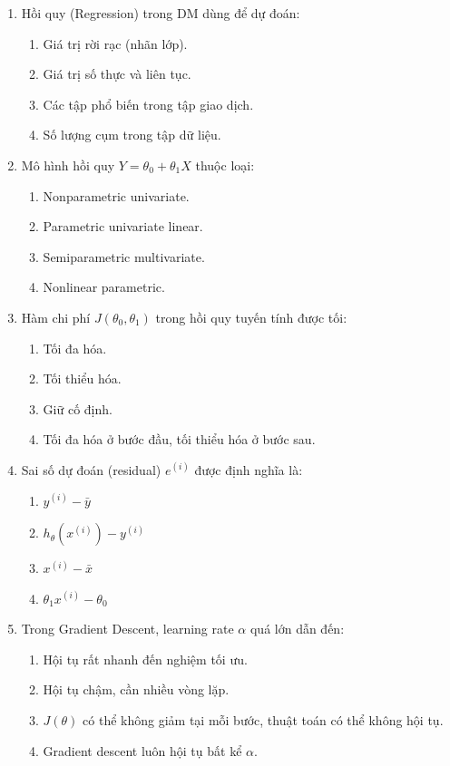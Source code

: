 \documentclass[10pt]{article}
\begin{document}
\begin{enumerate}[leftmargin=*, label=\textbf{Câu \arabic*.}]

    \item Hồi quy (Regression) trong DM dùng để dự đoán:
    \begin{enumerate}[label=\Alph*.]
        \item Giá trị rời rạc (nhãn lớp).
        \item Giá trị số thực và liên tục.
        \item Các tập phổ biến trong tập giao dịch.
        \item Số lượng cụm trong tập dữ liệu.
    \end{enumerate}

    \item Mô hình hồi quy $Y = \theta_0 + \theta_1 X$ thuộc loại:
    \begin{enumerate}[label=\Alph*.]
        \item Nonparametric univariate.
        \item Parametric univariate linear.
        \item Semiparametric multivariate.
        \item Nonlinear parametric.
    \end{enumerate}

    \item Hàm chi phí $J(\theta_0, \theta_1)$ trong hồi quy tuyến tính được tối:
    \begin{enumerate}[label=\Alph*.]
        \item Tối đa hóa.
        \item Tối thiểu hóa.
        \item Giữ cố định.
        \item Tối đa hóa ở bước đầu, tối thiểu hóa ở bước sau.
    \end{enumerate}

    \item Sai số dự đoán (residual) $e^{(i)}$ được định nghĩa là:
    \begin{enumerate}[label=\Alph*.]
        \item $y^{(i)} - \bar{y}$
        \item $h_\theta(x^{(i)}) - y^{(i)}$
        \item $x^{(i)} - \bar{x}$
        \item $\theta_1 x^{(i)} - \theta_0$
    \end{enumerate}

    \item Trong Gradient Descent, learning rate $\alpha$ quá lớn dẫn đến:
    \begin{enumerate}[label=\Alph*.]
        \item Hội tụ rất nhanh đến nghiệm tối ưu.
        \item Hội tụ chậm, cần nhiều vòng lặp.
        \item $J(\theta)$ có thể không giảm tại mỗi bước, thuật toán có thể không hội tụ.
        \item Gradient descent luôn hội tụ bất kể $\alpha$.
    \end{enumerate}


\end{enumerate}
\end{document}
